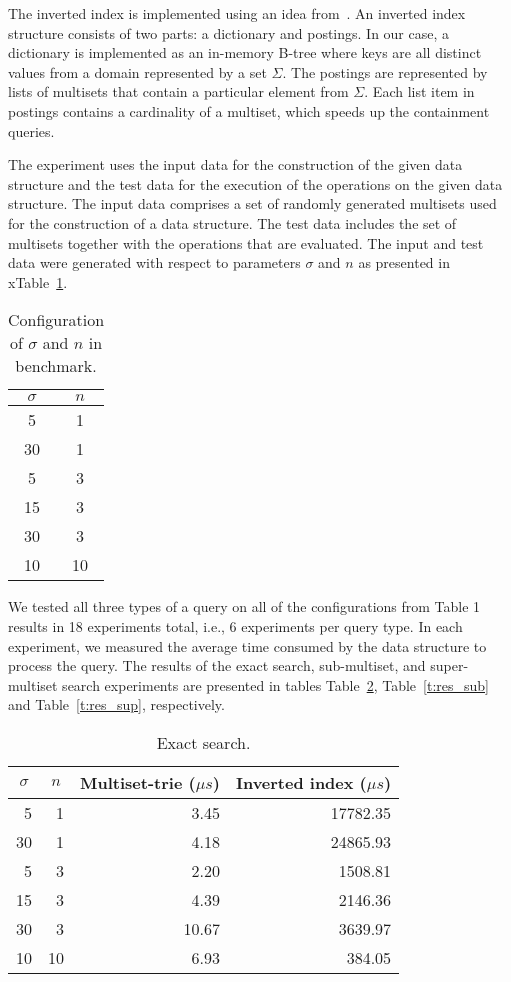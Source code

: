 The inverted index is implemented using an idea
from~\cite{Helmer2003}. An inverted index structure consists of two
parts: a dictionary and postings. In our case, a dictionary is
implemented as an in-memory B-tree where keys are all distinct values
from a domain represented by a set $\Sigma.$ The postings are
represented by lists of multisets that contain a particular element
from $\Sigma.$ Each list item in postings contains a cardinality of a
multiset, which speeds up the containment queries.

The experiment uses the input data for the construction of the given
data structure and the test data for the execution of the operations
on the given data structure. The input data comprises a set of
randomly generated multisets used for the construction of a data
structure. The test data includes the set of multisets together with
the operations that are evaluated. The input and test data were
generated with respect to parameters $\sigma$ and $n$ as presented in
xTable~\ref{t:benchmark}.

\begin{table}[h]
\center
\begin{tabular}{|c|c|}
\hline
$\sigma$ & $n$ \\
\hline
5		& 1\\
\hline
30	& 1 \\
\hline
5		& 3 \\
\hline
15	& 3 \\
\hline
30	& 3 \\
\hline
10	& 10 \\
\hline
\end{tabular}
\caption{Configuration of $\sigma$ and $n$ in benchmark.}
\label{t:benchmark}
\end{table}

We tested all three types of a query on all of the configurations from
Table 1 results in 18 experiments total, i.e., 6 experiments per
query type. In each experiment, we measured the average time consumed
by the data structure to process the query. The results of the exact
search, sub-multiset, and super-multiset search experiments are
presented in tables Table~\ref{t:res_ex}, Table~\ref{t:res_sub} and
Table~\ref{t:res_sup}, respectively.

\begin{table}[h]
\center
\begin{tabular}{|r|r|r|r|}
\hline
\multicolumn{1}{|c|}{$\sigma$} & 
\multicolumn{1}{c|}{$n$} & 
\multicolumn{1}{c|}{Multiset-trie ($\mu s$)} & 
\multicolumn{1}{c|}{Inverted index ($\mu s$)} \\
\hline
5		& 1 & 3.45 & 17782.35\\
\hline
30	& 1 & 4.18 & 24865.93\\
\hline
5		& 3 & 2.20 & 1508.81\\
\hline
15	& 3 & 4.39 & 2146.36\\
\hline
30	& 3 & 10.67 & 3639.97\\
\hline
10	& 10 & 6.93 & 384.05\\
\hline
\end{tabular}
\caption{Exact search.}
\label{t:res_ex}
\end{table}

